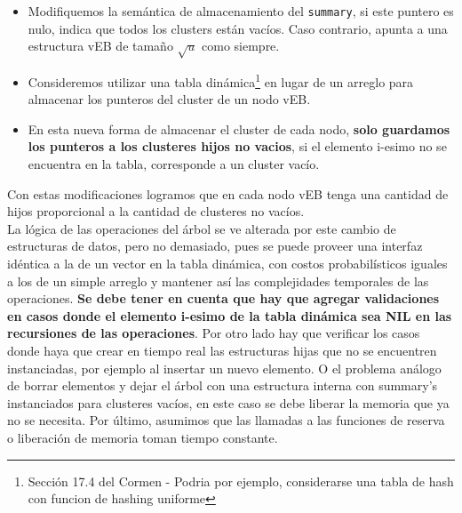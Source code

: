 \documentclass[10pt,a4paper]{article}
\begin{document}
\begin{itemize}
\item Modifiquemos la semántica de almacenamiento del \texttt{summary}, si este puntero es nulo, indica que todos los clusters están vacíos. Caso contrario, apunta a una estructura vEB de tamaño $\sqrt{u}$ como siempre.
\item Consideremos utilizar una tabla dinámica\footnote{Sección 17.4 del Cormen - Podria por ejemplo, considerarse una tabla de hash con funcion de hashing uniforme} en lugar de un arreglo para almacenar los punteros del cluster de un nodo vEB. 
\item En esta nueva forma de almacenar el cluster de cada nodo, \textbf{solo guardamos los punteros a los clusteres hijos no vacios}, si el elemento i-esimo no se encuentra en la tabla, corresponde a un cluster vacío.
\end{itemize}

Con estas modificaciones logramos que en cada nodo vEB tenga una cantidad de hijos proporcional a la cantidad de clusteres no vacíos.\\

La lógica de las operaciones del árbol se ve alterada por este cambio de estructuras de datos, pero no demasiado, pues se puede proveer una interfaz idéntica a la de un vector en la tabla dinámica, con costos probabilísticos iguales a los de un simple arreglo y mantener así las complejidades temporales de las operaciones. \textbf{Se debe tener en cuenta que hay que agregar validaciones en casos donde el elemento i-esimo de la tabla dinámica sea NIL en las recursiones de las operaciones}. Por otro lado hay que verificar los casos donde haya que crear en tiempo real las estructuras hijas que no se encuentren instanciadas, por ejemplo al insertar un nuevo elemento. O el problema análogo de borrar elementos y dejar el árbol con una estructura interna con summary's instanciados para clusteres vacíos, en este caso se debe liberar la memoria que ya no se necesita. Por último, asumimos que las llamadas a las funciones de reserva o liberación de memoria toman tiempo constante.\\
\end{document}
